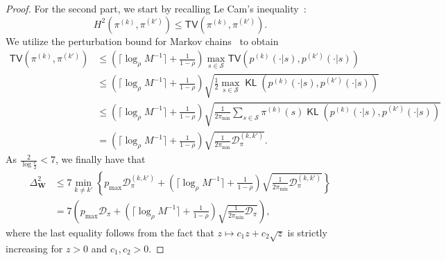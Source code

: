 \documentclass[twoside]{article}
\providecommand{\ceil}[2][-1]{
\ensuremath{\mathinner{
\ifthenelse{\equal{#1}{-1}}{ %
\!\left\lceil#2\right\rceil}{}
\ifthenelse{\equal{#1}{0}}{ %
\lceil#2\rceil}{}
\ifthenelse{\equal{#1}{1}}{ %
\!\bigl\lceil#2\bigr\rceil}{}
\ifthenelse{\equal{#1}{2}}{ %
\!\Bigl\lceil#2\Bigr\rceil}{}
\ifthenelse{\equal{#1}{3}}{ %
\!\biggl\lceil#2\biggr\rceil}{}
\ifthenelse{\equal{#1}{4}}{ %
\!\Biggl\lceil#2\Biggr\rceil}{}
}} %
}
\DeclareMathOperator{\KL}{{\mathsf{KL}}}
\def\TV{\mathsf{TV}}
\def\mW{{\bm{W}}}
\def\gD{{\mathcal{D}}}
\def\gS{{\mathcal{S}}}
\theoremstyle{plain}
\def\ceil#1{\lceil #1 \rceil}
\begin{document}
\begin{proof}
    For the second part, we start by recalling Le Cam's inequality~\citep[Lemma 2.3]{tsybakov09}:
    \begin{equation*}
        H^2\left( \pi^{(k)}, \pi^{(k')} \right) \leq \TV\left( \pi^{(k)}, \pi^{(k')} \right).
    \end{equation*}
    We utilize the perturbation bound for Markov chains~\citep[Corollary 3.1]{mitrophanov2005sensitivity} to obtain
    \begin{align*}
        \TV\left( \pi^{(k)}, \pi^{(k')} \right) &\leq \left( \ceil{\log_\rho M^{-1}} + \frac{1}{1 - \rho} \right) \max_{s \in \gS} \TV\left( p^{(k)}(\cdot | s), p^{(k')}(\cdot | s) \right) \\
        &\leq \left( \ceil{\log_\rho M^{-1}} + \frac{1}{1 - \rho} \right) \sqrt{\frac{1}{2} \max_{s \in \gS} \KL\left( p^{(k)}(\cdot | s), p^{(k')}(\cdot | s) \right)} \tag{Pinsker's inequality} \\
        &\leq \left( \ceil{\log_\rho M^{-1}} + \frac{1}{1 - \rho} \right) \sqrt{\frac{1}{2 \pi_{\min}} \sum_{s \in \gS} \pi^{(k)}(s) \KL\left( p^{(k)}(\cdot | s), p^{(k')}(\cdot | s) \right)} \\
        &= \left( \ceil{\log_\rho M^{-1}} + \frac{1}{1 - \rho} \right) \sqrt{\frac{1}{2 \pi_{\min}} \gD_\pi^{(k,k')}}.
    \end{align*}
    As $\frac{2}{\log\frac{e}{2}} < 7$, we finally have that
    \begin{align*}
        \Delta_\mW^2 &\leq 7 \min_{k \neq k'} \left\{ p_{\max} \gD_\pi^{(k,k')} + \left( \ceil{\log_\rho M^{-1}} + \frac{1}{1 - \rho} \right) \sqrt{\frac{1}{2 \pi_{\min}} \gD_\pi^{(k,k')}} \right\} \\
        &= 7 \left( p_{\max} \gD_\pi + \left( \ceil{\log_\rho M^{-1}} + \frac{1}{1 - \rho} \right) \sqrt{\frac{1}{2 \pi_{\min}} \gD_\pi} \right),
    \end{align*}
    where the last equality follows from the fact that $z \mapsto c_1 z + c_2 \sqrt{z}$ is strictly increasing for $z > 0$ and $c_1, c_2 > 0$.
\end{proof}
\end{document}

